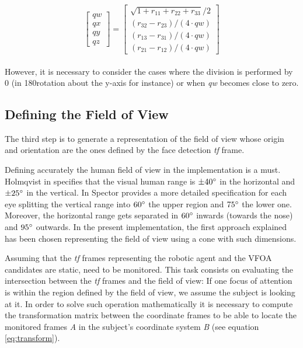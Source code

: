 \documentclass{sig-alternate}
\begin{document}
\begin{equation}
\begin{bmatrix}
qw \\
qx \\
qy \\
qz
\end{bmatrix}
=
\begin{bmatrix}
\sqrt{1 + r_{11} + r_{22} + r_{33}} /2 \\
(r_{32} - r_{23})/( 4 \cdot qw) \\
(r_{13} - r_{31})/( 4 \cdot qw) \\
(r_{21} - r_{12})/( 4 \cdot qw)
\end{bmatrix}
\label{eq:quat}
\end{equation}
\\
However, it is necessary to consider the cases where the division is performed by 0 (in 180\degree rotation about the y-axis for instance) or when \textit{qw} becomes close to zero.

\subsection{Defining the Field of View}
The third step is to generate a representation of the field of view whose origin and orientation are the ones defined by the face detection \textit{tf} frame. 

Defining accurately the human field of view in the implementation is a must. Holmqvist in \cite{holmqvist2011eye} specifies that the visual human range is $ \pm  40\degree $ in the horizontal and $ \pm 25\degree $ in the vertical. In \cite{walker1980clinical} Spector provides a more detailed specification for each eye splitting the vertical range into $ 60\degree $ the upper region and $ 75\degree $ the lower one. Moreover, the horizontal range gets separated in $ 60\degree $ inwards (towards the nose) and $ 95\degree $ outwards. In the present implementation, the first approach explained has been chosen representing the field of view using a cone with such dimensions.

Assuming that the \textit{tf} frames representing the robotic agent and the VFOA candidates are static, need to be monitored. This task consists on evaluating the intersection between the \textit{tf} frames and the field of view: If one focus of attention is within the region defined by the field of view, we assume the subject is looking at it. In order to solve such operation mathematically it is necessary to compute the transformation matrix between the coordinate frames to be able to locate the monitored frames \textit{A} in the subject's coordinate system \textit{B} (see equation \ref{eq:transform}).
\end{document}
